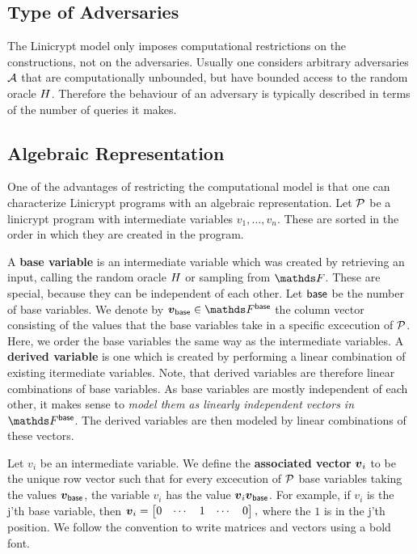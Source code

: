 \subsection{Type of Adversaries}
The Linicrypt model only imposes computational restrictions on the constructions,
not on the adversaries.
Usually one considers arbitrary adversaries $\A$ that are computationally unbounded,
but have bounded access to the random oracle $\H$.
Therefore the behaviour of an adversary is typically described in terms of the number of queries it makes.

\subsection{Algebraic Representation}

One of the advantages of restricting the computational model is that one can characterize
Linicrypt programs with an algebraic representation.
Let $\P$ be a linicrypt program with intermediate variables $v_1, \dots, v_n$.
These are sorted in the order in which they are created in the program.

A \textbf{base variable} is an intermediate variable which was created by retrieving an input,
calling the random oracle $\H$ or sampling from $\F$.
These are special, because they can be independent of each other.
Let $\base$ be the number of base variables.
We denote by $\vbase \in \Base$ the column vector
consisting of the values that the base variables take in a specific excecution of $\P$.
Here, we order the base variables the same way as the intermediate variables.
A \textbf{derived variable} is one which is created by performing a linear combination of existing itermediate variables.
Note, that derived variables are therefore linear combinations of base variables.
As base variables are mostly independent of each other,
it makes sense to \emph {model them as linearly independent vectors in $\Base$}.
The derived variables are then modeled by linear combinations of these vectors.

Let $v_i$ be an intermediate variable.
We define the \textbf{associated vector} $\v v_i$ to be the unique row vector such that
for every excecution of $\P$ base variables taking the values $\vbase$,
the variable $v_i$ has the value $\vv_i \vbase$.
For example, if $v_i$ is the j'th base variable, then 
$
  \v v_i = \begin{bmatrix}
  0 & \cdots & 1 & \cdots & 0
  \end{bmatrix},
$
where the $1$ is in the j'th position.
We follow the convention to write matrices and vectors using a bold font.


